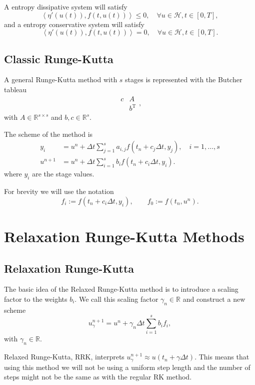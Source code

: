 \documentclass{article}
\newcommand{\inner}[2]{\left< #1 , #2 \right>}
\newcommand{\T}{\mathrm{T}}
\begin{document}
    \vspace*{5mm}
    A entropy dissipative system will satisfy
    \[\inner{\eta'(u(t))}{f(t, u(t))} \leq 0, \quad \forall u \in \mathcal{H}, t \in [0, T],\]
    and a entropy conservative system will satisfy
    \[\inner{\eta'(u(t))}{f(t, u(t))} = 0, \quad \forall u \in \mathcal{H}, t \in [0, T].\]


\subsection{Classic Runge-Kutta}
    A general Runge-Kutta method with \(s\) stages is represented with the Butcher tableau
    \[\begin{array}{c|c}
        c & A\\
        \hline
        ~ & b^{\T}
    \end{array},\]
    with \(A \in \mathbb{R}^{s \times s}\) and \(b, c \in \mathbb{R}^s.\)

    \vspace*{7mm}
    \noindent
    The scheme of the method is
    \begin{align}
        y_i &= u^{n} + \Delta t\sum_{j=1}^{s} a_{i,j} f(t_n + c_j \Delta t, y_j), \quad i = 1,\ldots,s \label{Eq_RK_Stage} \\
        u^{n+1} &= u^{n} + \Delta t \sum_{i=1}^{s} b_i f(t_n + c_i \Delta t, y_i). \label{Eq_RK_Scheme}
    \end{align}
    where \(y_i\) are the stage values.

    \vspace*{7mm}
    \noindent
    For brevity we will use the notation
    \[f_i := f(t_n + c_i \Delta t, y_i), \qquad f_0 := f(t_n, u^n).\]


\section{Relaxation Runge-Kutta Methods}
\subsection{Relaxation Runge-Kutta}
    The basic idea of the Relaxed Runge-Kutta method is to introduce a scaling factor to the weights \(b_i\). We call this scaling factor \(\gamma_n \in \mathbb{R}\) and construct a new scheme
    \[u^{n+1}_{\gamma} = u^{n} + \gamma_n \Delta t \sum_{i=1}^{s} b_i f_i,\]
    with \(\gamma_n \in \mathbb{R}\).

    \vspace*{10mm}
    Relaxed Runge-Kutta, RRK, interprets \(u_{\gamma}^{n+1} \approx u(t_n + \gamma \Delta t)\). This means that using this method we will not be using a uniform step length and the number of steps might not be the same as with the regular RK method.
\end{document}
